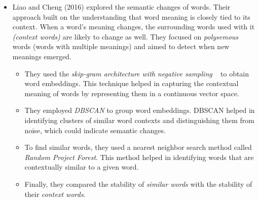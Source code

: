 \begin{itemize}
    \item {}
        Liao and Cheng (2016) explored the semantic changes of words.
        Their approach built on the understanding that word meaning is closely tied to its context.
        When a word's meaning changes, the surrounding words used with it \emph{(context words)} are likely to change as well.
        They focused on \emph{polysemous} words (words with multiple meanings) and aimed to detect when new meanings emerged.
    \begin{itemize}
        \item They used the \emph{skip-gram architecture with negative sampling} ~\cite{10.5555/2999792.2999959} to obtain word embeddings.
        This technique helped in capturing the contextual meaning of words by representing them in a continuous vector space.
        \item They employed \emph{DBSCAN} to group word embeddings.
        DBSCAN helped in identifying clusters of similar word contexts and distinguishing them from noise, which could indicate semantic changes.
        \item To find similar words, they used a nearest neighbor search method called \emph{Random Project Forest}.
        This method helped in identifying words that are contextually similar to a given word.
        \item Finally, they compared the stability of \emph{similar words} with the stability of their \emph{context words}.
    \end{itemize}


\end{itemize}
